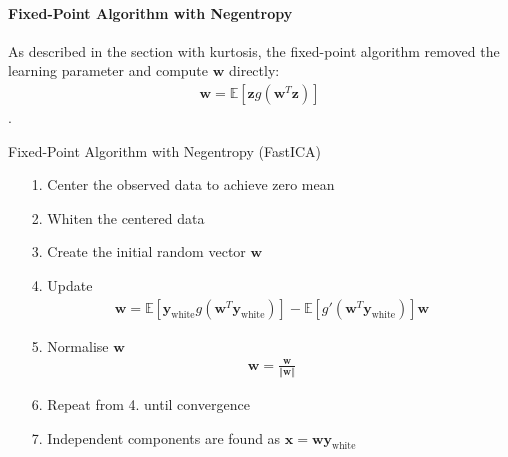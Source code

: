 \paragraph{Fixed-Point Algorithm with Negentropy}
As described in the section with kurtosis, the fixed-point algorithm removed the learning parameter and compute $\mathbf{w}$ directly:
\begin{align*}
\mathbf{w} = \mathbb{E}[\mathbf{z} g(\mathbf{w}^T \mathbf{z})]
\end{align*}
.
\begin{algorithm}[H]
\caption{Fixed-Point Algorithm with Negentropy (FastICA)}
\begin{itemize}
\item[1.] Center the observed data to achieve zero mean
\item[2.] Whiten the centered data
\item[3.] Create the initial random vector $\mathbf{w}$
\item[4.] Update
\begin{align*}
\mathbf{w} = \mathbb{E}[ \mathbf{y}_{\text{white}} g(\mathbf{w}^T \mathbf{y}_{\text{white}})] - \mathbb{E}[g'(\mathbf{w}^T \mathbf{y}_{\text{white}})] \mathbf{w}
\end{align*}
\item[5.] Normalise $\mathbf{w}$
\begin{align*}
\mathbf{w} = \frac{\mathbf{w}}{\Vert \mathbf{w} \Vert}
\end{align*}
\item[6.] Repeat from 4. until convergence
\item[7.] Independent components are found as $\mathbf{x} = \mathbf{w} \mathbf{y}_{\text{white}}$
\end{itemize}
\end{algorithm}


